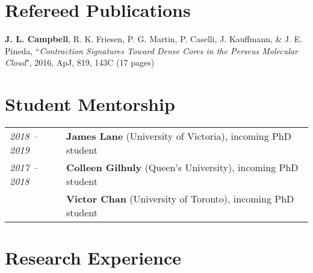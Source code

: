 \documentclass[10pt]{res} %
\begin{document}
\begin{resume}
\section{\Large Refereed Publications}
\vspace{-5pt} %
\noindent\makebox[\linewidth]{\rule{\textwidth}{0.4pt}}
\vspace{-20pt} %

\textbf{J. L. Campbell}, R. K. Friesen, P. G. Martin, P. Caselli, J. Kauffmann, \& J. E. Pineda, ``\textit{Contraction Signatures Toward Dense Cores in the Perseus Molecular Cloud}", 2016, ApJ, 819, 143C (17 pages)


\section{\Large Student Mentorship}
\vspace{-5pt} %
\noindent\makebox[\linewidth]{\rule{\textwidth}{0.4pt}}
\vspace{-20pt} %

\begin{table}[h!]
\begin{tabularx}{\textwidth}{lX}
\textit{2018 -- 2019} & \textbf{James Lane} (University of Victoria), incoming PhD student \\
\textit{2017 -- 2018} & \textbf{Colleen Gilhuly} (Queen's University), incoming PhD student \\
                                  & \textbf{Victor Chan} (University of Toronto), incoming PhD student
\end{tabularx}
\end{table}



\newpage
\section{\Large Research Experience}
\vspace{-5pt} %
\noindent\makebox[\linewidth]{\rule{\textwidth}{0.4pt}}
\vspace{-20pt} %


\end{resume}
\end{document}
